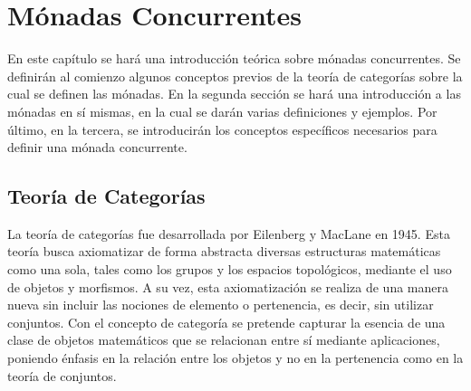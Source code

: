 \chapter{M\'onadas Concurrentes}\label{chapter:monconc}

En este capítulo se hará una introducción teórica sobre mónadas concurrentes. Se definirán al comienzo algunos conceptos previos de la teoría de categorías sobre la cual se definen las mónadas. En la segunda sección se hará una introducción a las mónadas en sí mismas, en la cual se darán varias definiciones y ejemplos. Por último, en la tercera, se introducirán los conceptos específicos necesarios para definir una mónada concurrente. 

\section{Teoría de Categorías}\label{monconc:cat}

La teoría de categorías fue desarrollada por Eilenberg y MacLane \cite{eilenberg:1945} en 1945. Esta teoría busca axiomatizar de forma abstracta diversas estructuras matemáticas como una sola, tales como los grupos y los espacios topológicos, mediante el uso de objetos y morfismos. A su vez, esta axiomatización se realiza de una manera nueva sin incluir las nociones de elemento o pertenencia, es decir, sin utilizar conjuntos. Con el concepto de categoría se pretende capturar la esencia de una clase de objetos matemáticos que se relacionan entre sí mediante aplicaciones, poniendo énfasis en la relación entre los objetos y no en la pertenencia como en la teoría de conjuntos.

